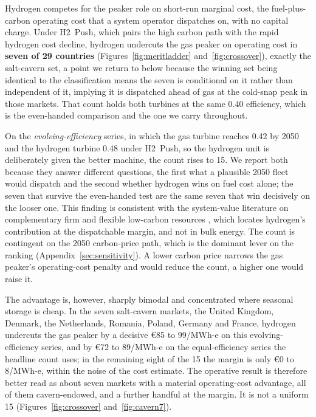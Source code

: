 Hydrogen competes for the peaker role on short-run marginal cost, the fuel-plus-carbon
operating cost that a system operator dispatches on, with no capital charge. Under
H2~Push, which pairs the high carbon path with the rapid hydrogen cost decline, hydrogen
undercuts the gas peaker on operating cost in \textbf{seven of 29 countries}
(Figures~\ref{fig:meritladder} and~\ref{fig:crossover}), exactly the salt-cavern set, a
point we return to below because the winning set being identical to the classification
means the seven is conditional on it rather than independent of it,
implying it is dispatched ahead of gas at the cold-snap peak in those markets. That
count holds both turbines at the same 0.40 efficiency, which is the even-handed
comparison and the one we carry throughout.

On the \emph{evolving-efficiency} series, in which the gas turbine reaches 0.42 by 2050
and the hydrogen turbine 0.48 under H2~Push, so the hydrogen unit is deliberately given
the better machine, the count rises to 15. We report both because they answer different
questions, the first what a plausible 2050 fleet would dispatch and the second whether
hydrogen wins on fuel cost alone; the seven that survive the even-handed test are the
same seven that win decisively on the looser one. This finding is consistent with the
system-value literature on complementary firm and flexible low-carbon resources
\citep{Bistline2020ValueOfTechnology,Lotze2024Complementary}, which locates hydrogen's
contribution at the dispatchable margin, and not in bulk energy. The count is
contingent on the 2050 carbon-price path, which is the dominant lever on the ranking
(Appendix~\ref{sec:sensitivity}). A lower carbon price narrows the gas peaker's
operating-cost penalty and would reduce the count, a higher one would raise it.

The advantage is, however, sharply bimodal and concentrated where seasonal storage is cheap. In the
seven salt-cavern markets, the United Kingdom, Denmark, the Netherlands, Romania, Poland, Germany
and France, hydrogen undercuts the gas peaker by a decisive \euro{}85 to 99/MWh-e on this evolving-efficiency series, and by \euro{}72 to 89/MWh-e on the equal-efficiency series the headline count uses; in the remaining eight of the 15 the margin is only \euro{}0 to 8/MWh-e, within the noise of the cost estimate.
The operative result is therefore better read as about seven markets with a material operating-cost
advantage, all of them cavern-endowed, and a further handful at the margin. It is not a uniform
15 (Figures~\ref{fig:crossover} and~\ref{fig:cavern7}).

